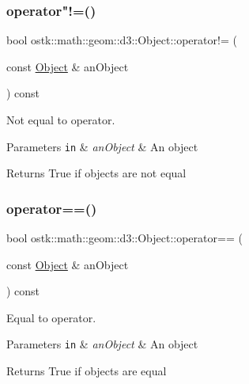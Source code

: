 \subsubsection{\texorpdfstring{operator"!=()}{operator!=()}}
{\footnotesize\ttfamily bool ostk\+::math\+::geom\+::d3\+::\+Object\+::operator!= (\begin{DoxyParamCaption}\item[{const \hyperlink{classostk_1_1math_1_1geom_1_1d3_1_1_object}{Object} \&}]{an\+Object }\end{DoxyParamCaption}) const}



Not equal to operator. 


\begin{DoxyParams}[1]{Parameters}
\mbox{\tt in}  & {\em an\+Object} & An object \\
\hline
\end{DoxyParams}
\begin{DoxyReturn}{Returns}
True if objects are not equal 
\end{DoxyReturn}
\mbox{\label{classostk_1_1math_1_1geom_1_1d3_1_1_object_a6fe8c0313e995c880062130577ea8096}} 
\subsubsection{\texorpdfstring{operator==()}{operator==()}}
{\footnotesize\ttfamily bool ostk\+::math\+::geom\+::d3\+::\+Object\+::operator== (\begin{DoxyParamCaption}\item[{const \hyperlink{classostk_1_1math_1_1geom_1_1d3_1_1_object}{Object} \&}]{an\+Object }\end{DoxyParamCaption}) const}



Equal to operator. 


\begin{DoxyParams}[1]{Parameters}
\mbox{\tt in}  & {\em an\+Object} & An object \\
\hline
\end{DoxyParams}
\begin{DoxyReturn}{Returns}
True if objects are equal 
\end{DoxyReturn}
\mbox{\label{classostk_1_1math_1_1geom_1_1d3_1_1_object_ab2a2a782503b97d1cecabdfedc636fce}} 
